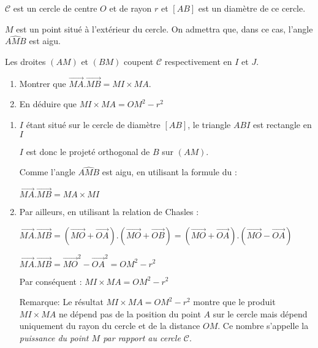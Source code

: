
%
\begin{center}
\end{center}
$\mathscr C$ est un cercle de centre $O$ et de rayon $r$ et $\left[AB\right]$ est un diamètre de ce cercle.
\par
$M$ est un point situé à l'extérieur du cercle. On admettra que, dans ce cas, l'angle $\widehat{AMB}$ est aigu.
\par
Les droites $\left(AM\right)$ et $\left(BM\right)$ coupent $\mathscr C$ respectivement en $I$ et $J$.
\begin{enumerate}
     \item
     Montrer que $\overrightarrow{MA}.\overrightarrow{MB}=MI\times MA$.
     \item
     En déduire que $MI\times MA=OM^{2}-r^{2}$
\end{enumerate}
\begin{corrige}
     \begin{enumerate}
          \item
          $I$ étant situé sur le cercle de diamètre $\left[AB\right]$, le triangle $ABI$ est rectangle en $I$
          \par
          $I$ est donc le projeté orthogonal de $B$ sur $\left(AM\right)$.
          \par
          Comme l'angle $\widehat{AMB}$ est aigu, en utilisant la formule du  :
          \par
          $\overrightarrow{MA}.\overrightarrow{MB}=MA\times MI$
          \item
          Par ailleurs, en utilisant la relation de Chasles :
          \par
          $\overrightarrow{MA}.\overrightarrow{MB}=\left(\overrightarrow{MO}+\overrightarrow{OA}\right).\left(\overrightarrow{MO}+\overrightarrow{OB}\right)=\left(\overrightarrow{MO}+\overrightarrow{OA}\right).\left(\overrightarrow{MO}-\overrightarrow{OA}\right)$
          \par
          $\overrightarrow{MA}.\overrightarrow{MB}=\overrightarrow{MO}^{2}-\overrightarrow{OA}^{2}=OM^{2}-r^{2}$
          \par
          Par conséquent : $MI\times MA=OM^{2}-r^{2}$
          \par
          Remarque: Le résultat $MI\times MA=OM^{2}-r^{2}$ montre que le produit $MI\times MA$ ne dépend pas de la position du point $A$ sur le cercle mais dépend uniquement du rayon du cercle et de la distance $OM$. Ce nombre s'appelle la \textit{puissance du point $M$ par rapport au cercle $\mathscr C$}.
     \end{enumerate}
\end{corrige}
